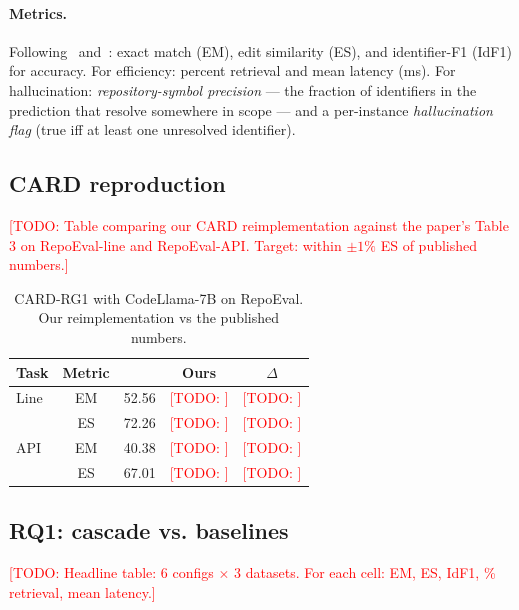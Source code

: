 \documentclass[10pt,twocolumn]{article}
\newcommand{\todo}[1]{\textcolor{red}{[TODO: #1]}}
\begin{document}
\paragraph{Metrics.} Following~\cite{ding2023cce} and~\cite{zhang2024card}:
exact match (EM), edit similarity (ES), and identifier-F1 (IdF1) for
accuracy. For efficiency: percent retrieval and mean latency (ms).
For hallucination: \emph{repository-symbol precision} --- the fraction
of identifiers in the prediction that resolve somewhere in scope ---
and a per-instance \emph{hallucination flag} (true iff at least one
unresolved identifier).

\subsection{CARD reproduction}

\todo{Table comparing our CARD reimplementation against the paper's Table 3
on RepoEval-line and RepoEval-API. Target: within $\pm 1\%$ ES of published
numbers.}

\begin{table}[h]
\centering
\small
\begin{tabular}{lcccc}
\toprule
Task & Metric & \cite{zhang2024card} & Ours & $\Delta$ \\
\midrule
Line & EM & 52.56 & \todo{} & \todo{} \\
     & ES & 72.26 & \todo{} & \todo{} \\
API  & EM & 40.38 & \todo{} & \todo{} \\
     & ES & 67.01 & \todo{} & \todo{} \\
\bottomrule
\end{tabular}
\caption{CARD-RG1 with CodeLlama-7B on RepoEval. Our reimplementation vs the
published numbers.}
\label{tab:card_reproduction}
\end{table}

\subsection{RQ1: cascade vs. baselines}

\todo{Headline table: 6 configs $\times$ 3 datasets. For each cell:
EM, ES, IdF1, \% retrieval, mean latency.}
\end{document}
